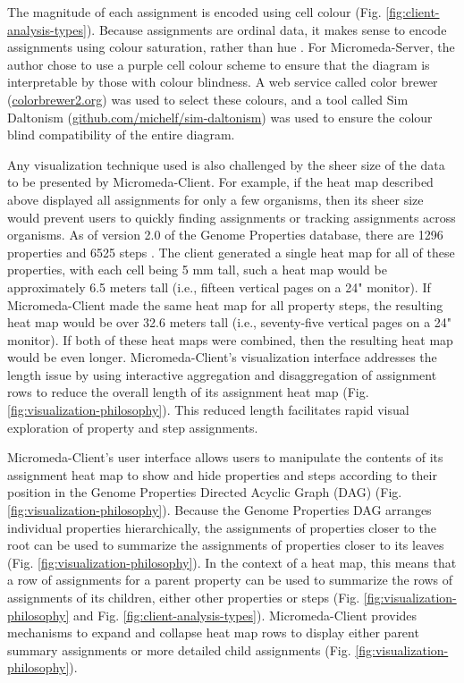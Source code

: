 The magnitude of each assignment is encoded using cell colour (Fig. \ref{fig:client-analysis-types}). Because assignments are ordinal data, it makes sense to encode assignments using colour saturation, rather than hue \cite{munzner2015visualization}. For Micromeda-Server, the author chose to use a purple cell colour scheme to ensure that the diagram is interpretable by those with colour blindness. A web service called color brewer (\href{colorbrewer2.org}{colorbrewer2.org}) was used to select these colours, and a tool called Sim Daltonism (\href{github.com/michelf/sim-daltonism}{github.com/michelf/sim-daltonism}) was used to ensure the colour blind compatibility of the entire diagram.

Any visualization technique used is also challenged by the sheer size of the data to be presented by Micromeda-Client. For example, if the heat map described above displayed all assignments for only a few organisms, then its sheer size would prevent users to quickly finding assignments or tracking assignments across organisms. As of version 2.0 of the Genome Properties database, there are 1296 properties and 6525 steps \cite{richardson2018genome}. The client generated a single heat map for all of these properties, with each cell being 5 mm tall, such a heat map would be approximately 6.5 meters tall (i.e., fifteen vertical pages on a 24" monitor). If Micromeda-Client made the same heat map for all property steps, the resulting heat map would be over 32.6 meters tall (i.e., seventy-five vertical pages on a 24" monitor). If both of these heat maps were combined, then the resulting heat map would be even longer. Micromeda-Client's visualization interface addresses the length issue by using interactive aggregation and disaggregation \cite{munzner2015visualization} of assignment rows to reduce the overall length of its assignment heat map (Fig. \ref{fig:visualization-philosophy}). This reduced length facilitates rapid visual exploration of property and step assignments.

Micromeda-Client's user interface allows users to manipulate the contents of its assignment heat map to show and hide properties and steps according to their position in the Genome Properties Directed Acyclic Graph (DAG) \cite{richardson2018genome} (Fig. \ref{fig:visualization-philosophy}). Because the Genome Properties DAG arranges individual properties hierarchically, the assignments of properties closer to the root can be used to summarize the assignments of properties closer to its leaves (Fig. \ref{fig:visualization-philosophy}). In the context of a heat map, this means that a row of assignments for a parent property can be used to summarize the rows of assignments of its children, either other properties or steps (Fig. \ref{fig:visualization-philosophy} and Fig. \ref{fig:client-analysis-types}). Micromeda-Client provides mechanisms to expand and collapse heat map rows to display either parent summary assignments or more detailed child assignments (Fig. \ref{fig:visualization-philosophy}).

